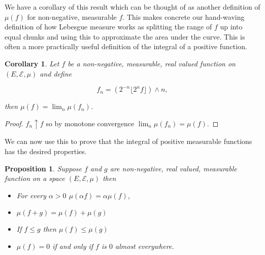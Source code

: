 \documentclass[
]{book}
\providecommand{\tightlist}{%
  \setlength{\itemsep}{0pt}\setlength{\parskip}{0pt}}
\newtheorem{corollary}{Corollary}[chapter]
\newtheorem{proposition}{Proposition}[chapter]
\theoremstyle{definition}
\theoremstyle{definition}
\theoremstyle{definition}
\theoremstyle{definition}
\theoremstyle{remark}
\begin{document}
We have a corollary of this result which can be thought of as another definition of \(\mu(f)\) for non-negative, measurable \(f\). This makes concrete our hand-waving definition of how Lebesgue measure works as splitting the range of \(f\) up into equal chunks and using this to approximate the area under the curve. This is often a more practically useful definition of the integral of a positive function.

\begin{corollary}
Let \(f\) be a non-negative, measurable, real valued function on \((E, \mathcal{E}, \mu)\) and define

\[ f_n = \left( 2^{-n} \lfloor 2^n f \rfloor \right) \wedge n, \]

then \(\mu(f) = \lim_n \mu(f_n)\).
\end{corollary}

\begin{proof}
\(f_n \uparrow f\) so by monotone convergence \(\lim_n \mu(f_n) = \mu(f)\).
\end{proof}

We can now use this to prove that the integral of positive measurable functions has the desired properties.

\begin{proposition}

Suppose \(f\) and \(g\) are non-negative, real valued, measurable function on a space \((E, \mathcal{E}, \mu)\) then

\begin{itemize}
\tightlist
\item
  For every \(\alpha>0\) \(\mu(\alpha f) = \alpha \mu(f)\),
\item
  \(\mu(f+g) = \mu(f) + \mu(g)\)
\item
  If \(f \leq g\) then \(\mu(f) \leq \mu(g)\)
\item
  \(\mu(f) = 0\) if and only if \(f\) is \(0\) almost everywhere.
\end{itemize}

\end{proposition}
\end{document}
